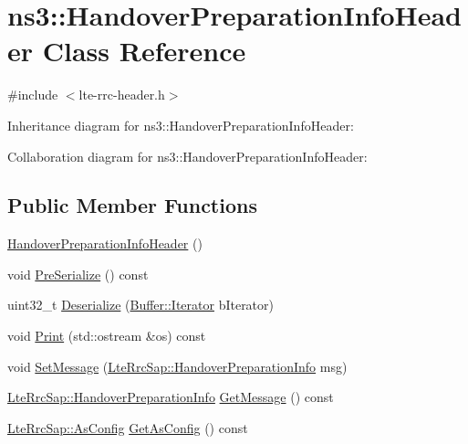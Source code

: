 \hypertarget{classns3_1_1HandoverPreparationInfoHeader}{}\section{ns3\+:\+:Handover\+Preparation\+Info\+Header Class Reference}
\label{classns3_1_1HandoverPreparationInfoHeader}


{\ttfamily \#include $<$lte-\/rrc-\/header.\+h$>$}



Inheritance diagram for ns3\+:\+:Handover\+Preparation\+Info\+Header\+:


Collaboration diagram for ns3\+:\+:Handover\+Preparation\+Info\+Header\+:
\subsection*{Public Member Functions}
\begin{DoxyCompactItemize}
\item 
\hyperlink{classns3_1_1HandoverPreparationInfoHeader_acee8cc971f1f30bad682685b7ed07dc6}{Handover\+Preparation\+Info\+Header} ()
\item 
void \hyperlink{classns3_1_1HandoverPreparationInfoHeader_a9edeb5f4247cf4b8b2e7353a87fd6a6b}{Pre\+Serialize} () const 
\item 
uint32\+\_\+t \hyperlink{classns3_1_1HandoverPreparationInfoHeader_aee844b98e550f07ccf59193acd0a5f43}{Deserialize} (\hyperlink{classns3_1_1Buffer_1_1Iterator}{Buffer\+::\+Iterator} b\+Iterator)
\item 
void \hyperlink{classns3_1_1HandoverPreparationInfoHeader_a2c5336ebec92fc62f19a3a7eb4b956b4}{Print} (std\+::ostream \&os) const 
\item 
void \hyperlink{classns3_1_1HandoverPreparationInfoHeader_a5d49abf255053e84008541a51b0b8bd2}{Set\+Message} (\hyperlink{structns3_1_1LteRrcSap_1_1HandoverPreparationInfo}{Lte\+Rrc\+Sap\+::\+Handover\+Preparation\+Info} msg)
\item 
\hyperlink{structns3_1_1LteRrcSap_1_1HandoverPreparationInfo}{Lte\+Rrc\+Sap\+::\+Handover\+Preparation\+Info} \hyperlink{classns3_1_1HandoverPreparationInfoHeader_aefbc81a3e2609d599921f6f80550fbe5}{Get\+Message} () const 
\item 
\hyperlink{structns3_1_1LteRrcSap_1_1AsConfig}{Lte\+Rrc\+Sap\+::\+As\+Config} \hyperlink{classns3_1_1HandoverPreparationInfoHeader_a857028311ecf00a66d779de63031825d}{Get\+As\+Config} () const 
\end{DoxyCompactItemize}
